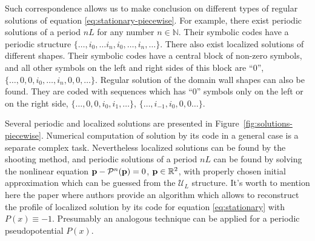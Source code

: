 Such correspondence allows us to make conclusion on different types of regular solutions of equation \eqref{eq:stationary-piecewise}.
For example, there exist periodic solutions of a period $nL$ for any number $n \in \mathbb{N}$.
Their symbolic codes have a periodic structure $\{ \dots, i_0, \dots i_n, i_0, \dots, i_n, \dots \}$.
There also exist localized solutions of different shapes.
Their symbolic codes have a central block of non-zero symbols, and all other symbols on the left and right sides of this block are ``$0$'', $\{ \dots, 0, 0, i_0, \dots, i_n, 0, 0, \dots \}$.
Regular solution of the domain wall shapes can also be found.
They are coded with sequences which has ``$0$'' symbols only on the left or on the right side, $\{ \dots, 0, 0, i_0, i_1, \dots \}$, $\{ \dots, i_{-1}, i_0, 0, 0 \dots \}$.

Several periodic and localized solutions are presented in Figure~\ref{fig:solutions-piecewise}.
Numerical computation of solution by its code in a general case is a separate complex task.
Nevertheless localized solutions can be found by the shooting method, and periodic solutions of a period $nL$ can be found by solving the nonlinear equation $\vb{p} - \mathcal{P}^n(\vb{p}) = 0$, $\vb{p} \in \mathbb{R}^2$, with properly chosen initial approximation which can be guessed from the $\mathscr{U}_L$ structure.
It's worth to mention here the paper \cite{AlfimovKizinZezyulin} where authors provide an algorithm which allows to reconstruct the profile of localized solution by its code for equation \eqref{eq:stationary} with $P(x) \equiv -1$.
Presumably an analogous technique can be applied for a periodic pseudopotential $P(x)$.

